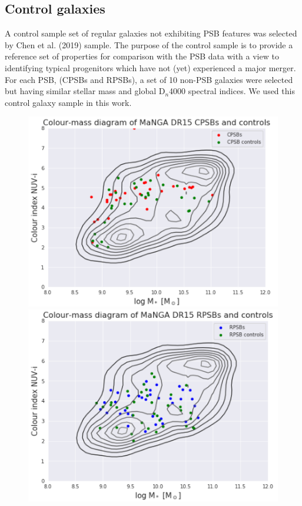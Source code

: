 \subsection{Control galaxies}
\label{sec:controls}
A control sample set of regular galaxies not exhibiting PSB features was selected by Chen et al. (2019) sample. The purpose of the control sample is to provide a reference set of properties for comparison with the PSB data with a view to identifying typical progenitors which have not (yet) experienced a major merger. For each PSB, (CPSBs and RPSBs), a set of 10 non-PSB galaxies were selected but having similar stellar mass and global D$_n$4000 spectral indices. We used this control galaxy sample in this work.

\begin{figure}
    \centering
    \includegraphics[width=\columnwidth]{images/CMDs/Colour-mass-CPSB+controls.png}
    \includegraphics[width=\columnwidth]{images/CMDs/Colour-mass-RPSB+controls.png}

\end{figure}
